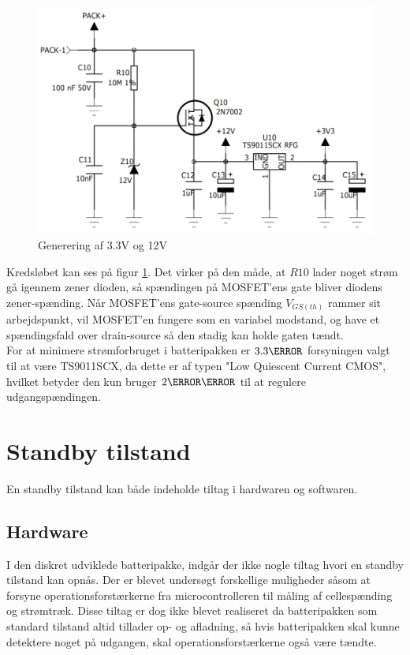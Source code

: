 \begin{figure}[h]
	\centering
	\includegraphics[width=12cm]{billeder/voltage_nets.png}
	\caption{Generering af 3.3V og 12V}
	\label{fig:voltage_nets}
\end{figure}

Kredsløbet kan ses på figur \ref{fig:voltage_nets}. Det virker på den måde, at $R10$ lader noget strøm gå igennem zener dioden, så spændingen på MOSFET'ens gate bliver diodens zener-spænding. Når MOSFET'ens gate-source spænding $V_{GS(th)}$ rammer sit arbejdspunkt, vil MOSFET'en fungere som en variabel modstand, og have et spændingsfald over drain-source så den stadig kan holde gaten tændt.
\\

For at minimere strømforbruget i batteripakken er $3.3\volt$ forsyningen valgt til at være TS9011SCX, da dette er af typen "Low Quiescent Current CMOS", hvilket betyder den kun bruger $2\micro\ampere$ til at regulere udgangspændingen.

\section{Standby tilstand}
En standby tilstand kan både indeholde tiltag i hardwaren og softwaren.

\subsection{Hardware}
I den diskret udviklede batteripakke, indgår der ikke nogle tiltag hvori en standby tilstand kan opnås. Der er blevet undersøgt forskellige muligheder såsom at forsyne operationsforstærkerne fra microcontrolleren til måling af cellespænding og strømtræk. Disse tiltag er dog ikke blevet realiseret da batteripakken som standard tilstand altid tillader op- og afladning, så hvis batteripakken skal kunne detektere noget på udgangen, skal operationsforstærkerne også være tændte.

